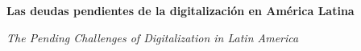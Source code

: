 
\renewcommand{\articuloidiomaxml}{es}
\renewcommand{\articulotitulo}{Las deudas pendientes de la digitalización en América Latina}
\renewcommand{\articuloautores}{Andrea Esther Liberatore}
\renewcommand{\articulodoi}{10.1787/7a127615-es}
\renewcommand{\articulotipo}{EDITORIAL}
\renewcommand{\articulorevista}{Agenda Digital Latinoamericana}
\renewcommand{\articuloissne}{1853-0028}
\renewcommand{\articulovolumen}{01}
\renewcommand{\articulonumero}{01}
\renewcommand{\articulofecha}{ 2026}
\renewcommand{\articulopagina}{1}

\setcounter{page}{1}
\thispagestyle{firstpage}

\noindent\begin{minipage}[t]{\dimexpr\textwidth+\marginparsep+\marginparwidth\relax}%
{\sffamily\bfseries\Large\articulotitulo\par}%
\end{minipage}\par
\vspace{3mm}%
\renewcommand{\articulotitulotrans}{The Pending Challenges of Digitalization in Latin America}
\noindent\begin{minipage}[t]{\dimexpr\textwidth+\marginparsep+\marginparwidth\relax}%
{\sffamily\itshape\normalsize\articulotitulotrans\par}%
\end{minipage}\par
\vspace{4mm}%

